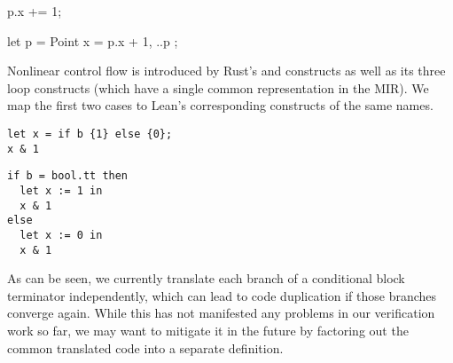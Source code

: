 \begin{sbs1}
p.x += 1;
\end{sbs1}
\begin{sbs2}
let p = Point { x = p.x + 1, ..p };
\end{sbs2}

Nonlinear control flow is introduced by Rust's  and 
constructs as well as its three loop constructs (which have a single common
representation in the MIR). We map the first two cases to Lean's corresponding
constructs of the same names.

\vspace{1em}\noindent\begin{minipage}[t]{0.3\textwidth}
  \begin{verbatim}
let x = if b {1} else {0};
x & 1
  \end{verbatim}
\end{minipage}
\hfill\vline\hfill\begin{adjustbox}{valign=t,minipage={0.33\textwidth}}
\end{adjustbox}
\hfill\vline\hfill\begin{minipage}[t]{0.3\textwidth}
  \begin{verbatim}
if b = bool.tt then
  let x := 1 in
  x & 1
else
  let x := 0 in
  x & 1
  \end{verbatim}
\end{minipage}\vspace{1em}

As can be seen, we currently translate each branch of a conditional block
terminator independently, which can lead to code duplication if those branches
converge again. While this has not manifested any problems in our verification
work so far, we may want to mitigate it in the future by factoring out the
common translated code into a separate definition.

